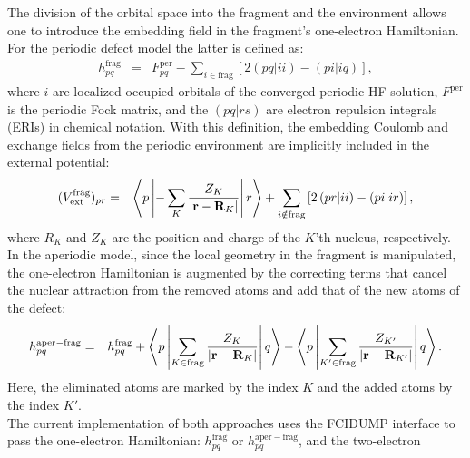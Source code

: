 \documentclass[a4paper,11pt,headings=normal]{scrartcl}
\begin{document}
The division of the orbital space into the fragment and the environment allows 
one to introduce the embedding field in the fragment's one-electron 
Hamiltonian. For the periodic defect model the latter is defined as:
\begin{eqnarray}
h^{\mathrm{frag}}_{pq}&=&F^{\mathrm{per}}_{pq}-\sum_{i\in{\mathrm{frag}}}\left[2\left(pq|ii\right)
  - \left(p i|i q\right)\right],\label{eq:h_frag}
\end{eqnarray}
where $i$ are localized occupied
orbitals of the converged periodic HF solution, $F^{\mathrm{per}}$ is the 
periodic Fock matrix, and the $(pq|rs)$ are electron repulsion integrals (ERIs) 
in chemical notation. With this definition, the embedding Coulomb and exchange 
fields from the periodic environment are implicitly included in the external 
potential:
\begin{eqnarray}
(V^{\mathrm{frag}}_{\mathrm{ext}})_{pr}&=& \left<p\left| -\sum_{K}{Z_K \over 
|{\mathbf r}-{\mathbf 
R}_K|}\right|r\right>+\sum_{i\notin{\mathrm{frag}}}\left[2\left(pr|ii\right) - 
\left(p i|i r\right)\right],\label{eq:Vext_frag}
\end{eqnarray}
where $R_K$ and $Z_K$ are the position and charge of the $K$'th nucleus, 
respectively.\\
In the aperiodic model, since the local geometry in the fragment is 
manipulated, the one-electron Hamiltonian is augmented by the correcting 
terms that cancel the nuclear attraction from the removed atoms and add that of 
the new atoms of the defect: 
\begin{eqnarray}
h^{\mathrm{aper-frag}}_{pq}&=&h^{\mathrm{frag}}_{pq} + \left< p\left| \sum_{K\in{\mathrm{frag}}}{Z_{K} \over |{\mathbf r}-{\mathbf
    R}_{K}|}\right|q\right>-\left< p\left| \sum_{K'\in{\mathrm{frag}}}{Z_{K'} \over |{\mathbf r}-{\mathbf
                           R}_{K'}|}\right|q\right>.\label{eq:defect_h}
\end{eqnarray}
Here, the eliminated atoms are marked by the index $K$ and the added atoms by 
the index $K'$.\\
The current implementation of both approaches uses the FCIDUMP 
interface\autocite{Handy1989a} to pass the one-electron Hamiltonian: $h^{\mathrm{frag}}_{pq}$ or $h^{\mathrm{aper-frag}}_{pq}$, and the two-electron 
\end{document}
